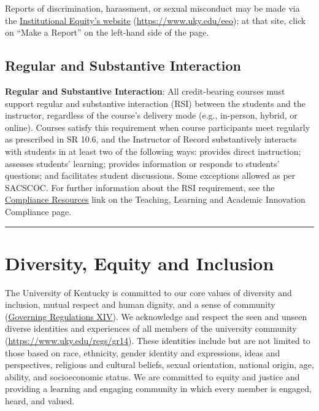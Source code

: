 \documentclass[
  letterpaper,
  DIV=11,
  numbers=noendperiod]{scrartcl}
\begin{document}
Reports of discrimination, harassment, or sexual misconduct may be made
via the \href{https://www.uky.edu/eeo/}{\uline{Institutional Equity's
website}} (\url{https://www.uky.edu/eeo}); at that site, click on ``Make
a Report'' on the left-hand side of the page.

\hypertarget{regular-and-substantive-interaction}{%
\subsection{Regular and Substantive
Interaction}\label{regular-and-substantive-interaction}}

\textbf{Regular and Substantive Interaction}: All credit-bearing courses
must support regular and substantive interaction (RSI) between the
students and the instructor, regardless of the course's delivery mode
(e.g., in-person, hybrid, or online). Courses satisfy this requirement
when course participants meet regularly as prescribed in SR 10.6, and
the Instructor of Record substantively interacts with students in at
least two of the following ways: provides direct instruction; assesses
students' learning; provides information or responds to students'
questions; and facilitates student discussions. Some exceptions allowed
as per SACSCOC. For further information about the RSI requirement, see
the \href{https://www.uky.edu/tlai/compliance-faculty}{\uline{Compliance
Resources}} link on the Teaching, Learning and Academic Innovation
Compliance page.

\begin{center}\rule{0.5\linewidth}{0.5pt}\end{center}

\hypertarget{diversity-equity-and-inclusion}{%
\section{Diversity, Equity and
Inclusion}\label{diversity-equity-and-inclusion}}

The University of Kentucky is committed to our core values of diversity
and inclusion, mutual respect and human dignity, and a sense of
community (\href{https://www.uky.edu/regs/gr14}{\uline{Governing
Regulations XIV}}). We acknowledge and respect the seen and unseen
diverse identities and experiences of all members of the university
community (\url{https://www.uky.edu/regs/gr14}). These identities
include but are not limited to those based on race, ethnicity, gender
identity and expressions, ideas and perspectives, religious and cultural
beliefs, sexual orientation, national origin, age, ability, and
socioeconomic status. We are committed to equity and justice and
providing a learning and engaging community in which every member is
engaged, heard, and valued.
\end{document}
